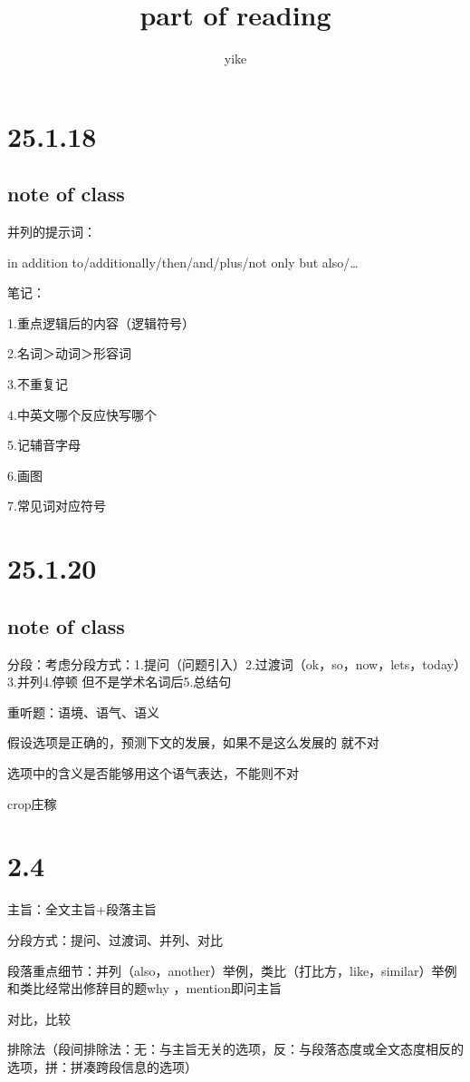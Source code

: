 \documentclass[a4paper, 10pt]{article}
\begin{document}
\title{{ \textbf {part of reading}}}
  \author{yike}
  \date{}
  
  \maketitle
\section{25.1.18}
\subsection{note of class}
并列的提示词：

in addition to/additionally/then/and/plus/not only but also/\dots

笔记：

1.重点逻辑后的内容（逻辑符号）

2.名词＞动词＞形容词

3.不重复记

4.中英文哪个反应快写哪个

5.记辅音字母

6.画图

7.常见词对应符号

\section{25.1.20}
\subsection{note of class}

分段：考虑分段方式：1.提问（问题引入）2.过渡词（ok，so，now，lets，today）3.并列4.停顿 但不是学术名词后5.总结句

重听题：语境、语气、语义

假设选项是正确的，预测下文的发展，如果不是这么发展的 就不对

选项中的含义是否能够用这个语气表达，不能则不对

crop庄稼


\section{2.4}

主旨：全文主旨+段落主旨

分段方式：提问、过渡词、并列、对比

段落重点细节：并列（also，another）举例，类比（打比方，like，similar）举例和类比经常出修辞目的题why ，mention即问主旨

对比，比较

排除法（段间排除法：无：与主旨无关的选项，反：与段落态度或全文态度相反的选项，拼：拼凑跨段信息的选项）
\end{document}
